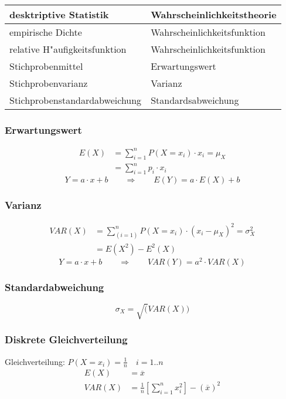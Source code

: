 \begin{center}
\begin{tabular}{ll}
	desktriptive Statistik & Wahrscheinlichkeitstheorie \\
	\hline
	empirische Dichte & Wahrscheinlichkeitsfunktion \\
	relative H"aufigkeitsfunktion & Wahrscheinlichkeitsfunktion \\
	Stichprobenmittel & Erwartungswert \\
	Stichprobenvarianz & Varianz \\
	Stichprobenstandardabweichung & Standardsabweichung
\end{tabular}
\end{center}

\subsubsection{Erwartungswert}
\begin{align}
	E(X) &= \sum_{i=1}^n P(X=x_i)\cdot x_i =\mu_X \\
		&= \sum_{i=1}^n p_i\cdot x_i
\end{align}
\begin{equation*}
	Y=a\cdot x+b\qquad\Longrightarrow\qquad E(Y) =a\cdot E(X)+b
\end{equation*}

\subsubsection{Varianz}
\begin{align}
	VAR(X) &=\sum_{(i=1)}^n P(X=x_i)\cdot (x_i-\mu_X)^2 = \sigma_X^2 \\
		&=E(X^2)-E^2(X)
\end{align}
\begin{equation*}
	Y=a\cdot x+b\qquad\Longrightarrow\qquad VAR(Y)=a^2\cdot VAR(X)
\end{equation*}

\subsubsection{Standardabweichung}
\begin{equation}
	\sigma_X=\sqrt(VAR(X))
\end{equation}

\subsubsection{Diskrete Gleichverteilung}
Gleichverteilung: $P(X=x_i)=\frac{1}{n}\quad i=1..n$
\begin{align*}
	E(X) &= \overline{x} \\
	VAR(X) &= \frac{1}{n}\left[{\sum_{i=1}^n x_i^2}\right]-(\overline{x})^2
\end{align*}

